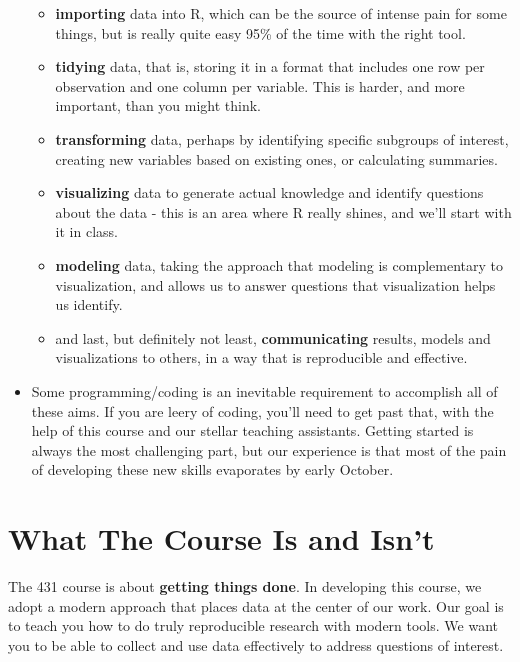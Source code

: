 \documentclass[
]{book}
\providecommand{\tightlist}{%
  \setlength{\itemsep}{0pt}\setlength{\parskip}{0pt}}
\begin{document}
\begin{itemize}
  \begin{itemize}
  \tightlist
  \item
    \textbf{importing} data into R, which can be the source of intense pain for some things, but is really quite easy 95\% of the time with the right tool.
  \item
    \textbf{tidying} data, that is, storing it in a format that includes one row per observation and one column per variable. This is harder, and more important, than you might think.
  \item
    \textbf{transforming} data, perhaps by identifying specific subgroups of interest, creating new variables based on existing ones, or calculating summaries.
  \item
    \textbf{visualizing} data to generate actual knowledge and identify questions about the data - this is an area where R really shines, and we'll start with it in class.
  \item
    \textbf{modeling} data, taking the approach that modeling is complementary to visualization, and allows us to answer questions that visualization helps us identify.
  \item
    and last, but definitely not least, \textbf{communicating} results, models and visualizations to others, in a way that is reproducible and effective.
  \end{itemize}
\item
  Some programming/coding is an inevitable requirement to accomplish all of these aims. If you are leery of coding, you'll need to get past that, with the help of this course and our stellar teaching assistants. Getting started is always the most challenging part, but our experience is that most of the pain of developing these new skills evaporates by early October.
\end{itemize}

\hypertarget{what-the-course-is-and-isnt}{%
\section{What The Course Is and Isn't}\label{what-the-course-is-and-isnt}}

The 431 course is about \textbf{getting things done}. In developing this course, we adopt a modern approach that places data at the center of our work. Our goal is to teach you how to do truly reproducible research with modern tools. We want you to be able to collect and use data effectively to address questions of interest.
\end{document}
